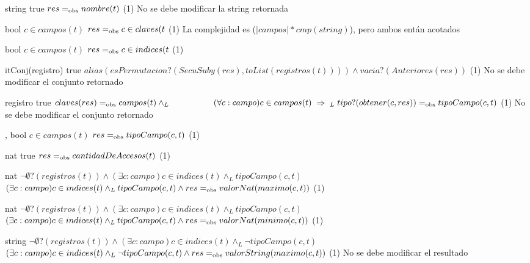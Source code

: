 {   }
{string}
{true}
{$res =_{\mathrm{obs}} nombre(t)$}
{\bigo(1)}
{No se debe modificar la string retornada}
{}

{   
    }
{bool}
{$c \in campos(t)$}
{$res =_{\mathrm{obs}} c \in claves(t$}
{\bigo(1)}
{}
{La complejidad es \bigo($|campos| * cmp(string)$), pero ambos entán acotados}

{   
    }
{bool}
{$c \in campos(t)$}
{$res =_{\mathrm{obs}} c \in indices(t$}
{\bigo(1)}
{}
{}

{   }
{itConj(registro)}
{true}
{$alias(esPermutacion?(SecuSuby(res), toList(registros(t)))) \land vacia?(Anteriores(res))$}
{\bigo(1)}
{No se debe modificar el conjunto retornado}
{}

{   }
{registro}
{true}
{$claves(res) \igobs campos(t) \land_L \\
    \hspace*{5em} (\forall c : campo) c \in campos(t) \implies_L \; tipo?(obtener(c,res)) \igobs tipoCampo(c,t)$}
{\bigo(1)}
{No se debe modificar el conjunto retornado}
{}

{   ,
    }
{bool}
{$c \in campos(t)$}
{$res =_{\mathrm{obs}} tipoCampo(c,t)$}
{\bigo(1)}
{}
{}

{   }
{nat}
{true}
{$res =_{\mathrm{obs}} cantidadDeAccesos(t)$}
{\bigo(1)}
{}
{}

{   }
{nat}
{$\neg\emptyset?(registros(t)) \land
    (\exists c : campo) c \in indices(t) \land_L tipoCampo(c,t)$}
{$(\exists c : campo) c \in indices(t) \land_L tipoCampo(c,t) \land
    res =_{\mathrm{obs}} valorNat(maximo(c,t))$}
{\bigo(1)}
{}
{}

{   }
{nat}
{$\neg\emptyset?(registros(t)) \land
    (\exists c : campo) c \in indices(t) \land_L tipoCampo(c,t)$}
{$(\exists c : campo) c \in indices(t) \land_L tipoCampo(c,t) \land
    res =_{\mathrm{obs}} valorNat(minimo(c,t))$}
{\bigo(1)}
{}
{}

{   }
{string}
{$\neg\emptyset?(registros(t)) \land
    (\exists c : campo) c \in indices(t) \land_L \neg tipoCampo(c,t)$}
{$(\exists c : campo) c \in indices(t) \land_L \neg tipoCampo(c,t) \land
    res =_{\mathrm{obs}} valorString(maximo(c,t))$}
{\bigo(1)}
{No se debe modificar el resultado}
{}


